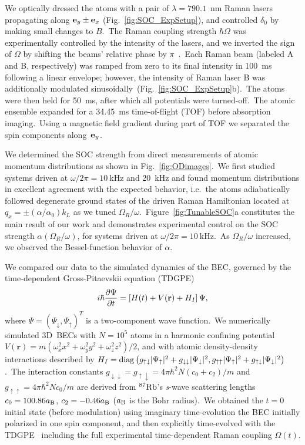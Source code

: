 \documentclass[twocolumn,amsmath,amssymb,floatfix,prl]{revtex4-1}
\begin{document}
We optically dressed the atoms with a pair of $\lambda = 790.1$~nm Raman lasers propagating along ${\bf e}_y \pm {\bf e}_x$ (Fig.~\ref{fig:SOC_ExpSetup}), and controlled $\delta_0$ by making small changes to $B$.~The Raman coupling strength $\hbar \Omega$ was experimentally controlled by the intensity of the lasers, and we inverted the sign of $\Omega$ by shifting the beams' relative phase by $\pi$~\cite{Juzeliunas2012}.~Each Raman beam (labeled A and B, respectively) was ramped from zero to its final intensity in 100~ms following a linear envelope; however, the intensity of Raman laser B was additionally modulated sinusoidally~(Fig.~\ref{fig:SOC_ExpSetup}b).~The atoms were then held for 50~ms, after which all potentials were turned-off.~The atomic ensemble expanded for a 34.45~ms time-of-flight (TOF) before absorption imaging.~Using a magnetic field gradient  during part of TOF we separated the spin components along~${\bf e}_y$.

We determined the SOC strength from direct measurements of atomic momentum distributions as shown in Fig.~\ref{fig:ODimages}.~We first studied systems driven at $\omega/2\pi = 10~$kHz and 20~kHz and found momentum distributions in excellent agreement with the expected behavior, i.e.~the atoms adiabatically followed degenerate ground states of the driven Raman Hamiltonian located at $q_x = \pm(\alpha/\alpha_0) k_L$ as we tuned $\Omega_R/\omega$.~Figure~\ref{fig:TunableSOC}a constitutes the main result of our work and demonstrates experimental control on the SOC strength $\alpha(\Omega_R/\omega)$, for systems driven at $\omega/2\pi = 10~$kHz.~As $\Omega_R/\omega$ increased, we observed the Bessel-function behavior of $\alpha$.

We compared our data to the simulated dynamics of the BEC, governed by the time-dependent Gross-Pitaevskii equation (TDGPE)
\begin{equation}
i\hbar \frac{\partial \Psi}{ \partial t} = \left [ H(t)+V({\bf r}) + H_{I}\right ] \Psi , \label{TGP}
\end{equation}%
where ${\Psi =(\Psi _{\downarrow },\Psi _{\uparrow })^{T}}$ is a two-component wave function.~We numerically simulated 3D~BECs with ${N=10^5}$ atoms in a harmonic confining potential~${V\left( \mathbf{r}\right) = m(\omega _{x}^{2}x^{2}+\omega _{y}^{2}y^{2}+\omega _{z}^{2}z^{2})/2}$, and with atomic density-density interactions described by $H_{I}= {\rm diag}\left( g_{\uparrow \downarrow }|\Psi _{\uparrow}|^{2}+g_{\downarrow \downarrow }|\Psi _{\downarrow }|^{2},g_{\uparrow \uparrow }|\Psi _{\uparrow }|^{2}+g_{\uparrow \downarrow }|\Psi _{\downarrow}|^{2}\right)$.~The interaction constants $g_{\downarrow \downarrow }=g_{\uparrow \downarrow }=4\pi \hbar^{2}N(c_{0}+c_{2})/m$ and $g_{\uparrow \uparrow }=4\pi \hbar^{2}Nc_{0}/m$ are derived from $^{87}{\rm Rb}$'s \textit{s}-wave scattering lengths ${c_{0}=100.86a_{\rm B}}$, ${c_{2}=-0.46a_{\rm B}}$ ($a_{\rm B}$ is the Bohr radius).~We obtained the ${t=0}$ initial state (before modulation) using imaginary time-evolution the BEC initially polarized in one spin component, and then explicitly time-evolved with the TDGPE~\cite{Bao2003} including the full experimental time-dependent Raman coupling $\Omega\left( t\right)$.
\end{document}
